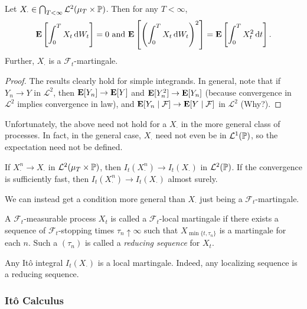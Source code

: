 \begin{lemma}
	Let $X_\cdot \in \bigcap_{T < \infty} \mathcal{L}^2(\mu_T\times\mathbb{P})$. Then for any $T<\infty$,
	\[ \textbf{E}\left[\int_0^T X_t\operatorname{d}\!{W}_t\right] = 0 \text{ and } \textbf{E}\left[\left(\int_0^T X_t\operatorname{d}\!{W}_t\right)^2\right] = \textbf{E}\left[\int_0^T X_t^2\operatorname{d}\!{t}\right]. \]
	Further, $X_\cdot$ is a $\mathcal{F}_t$-martingale.
\end{lemma}
\begin{proof}
	The results clearly hold for simple integrands. In general, note that if $Y_n \to Y$ in $\mathcal{L}^2$, then $\textbf{E}[Y_n] \to \textbf{E}[Y]$ and $\textbf{E}[Y_n^2] \to \textbf{E}[Y_n]$ (because convergence in $\mathcal{L}^2$ implies convergence in law), and $\textbf{E}[Y_n \mid \mathcal{F}] \to \textbf{E}[Y \mid \mathcal{F}]$ in $\mathcal{L}^2$ (Why?).
\end{proof}

Unfortunately, the above need not hold for a $X_\cdot$ in the more general class of processes. In fact, in the general case, $X_\cdot$ need not even be in $\mathcal{L}^1(\mathbb{P})$, so the expectation need not be defined.

\begin{corollary}
	If $X_\cdot^n \to X_\cdot$ in $\mathcal{L}^2(\mu_T\times\mathbb{P})$, then $I_t(X^n_\cdot) \to I_t(X_\cdot)$ in $\mathcal{L}^2(\mathbb{P})$. If the convergence is sufficiently fast, then $I_t(X_\cdot^n) \to I_t(X_\cdot)$ almost surely.
\end{corollary}

We can instead get a condition more general than $X_\cdot$ just being a $\mathcal{F}_t$-martingale.

\begin{definition}
	A $\mathcal{F}_t$-measurable process $X_t$ is called a $\mathcal{F}_t$-local martingale if there exists a sequence of $\mathcal{F}_t$-stopping times $\tau_n\uparrow\infty$ such that $X_{\min\{t,\tau_n\}}$ is a martingale for each $n$. Such a $(\tau_n)$ is called a \textit{reducing sequence} for $X_t$.
\end{definition}

Any It\^{o} integral $I_t(X_\cdot)$ is a local martingale. Indeed, any localizing sequence is a reducing sequence.

\subsubsection{It\^{o} Calculus}

